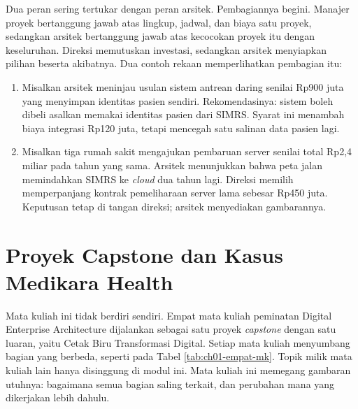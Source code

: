 Dua peran sering tertukar dengan peran arsitek. Pembagiannya begini. Manajer
proyek bertanggung jawab atas lingkup, jadwal, dan biaya satu proyek,
sedangkan arsitek bertanggung jawab atas kecocokan proyek itu dengan
keseluruhan. Direksi memutuskan investasi, sedangkan arsitek menyiapkan
pilihan beserta akibatnya. Dua contoh rekaan memperlihatkan pembagian itu:

\begin{enumerate}
  \item Misalkan arsitek meninjau usulan sistem antrean daring senilai Rp900
        juta yang menyimpan identitas pasien sendiri. Rekomendasinya: sistem
        boleh dibeli asalkan memakai identitas pasien dari SIMRS. Syarat ini
        menambah biaya integrasi Rp120 juta, tetapi mencegah satu salinan data
        pasien lagi.
  \item Misalkan tiga rumah sakit mengajukan pembaruan server senilai total
        Rp2,4 miliar pada tahun yang sama. Arsitek menunjukkan bahwa peta jalan
        memindahkan SIMRS ke \textit{cloud} dua tahun lagi. Direksi memilih
        memperpanjang kontrak pemeliharaan server lama sebesar Rp450 juta.
        Keputusan tetap di tangan direksi; arsitek menyediakan gambarannya.
\end{enumerate}

\section{Proyek Capstone dan Kasus Medikara Health}

Mata kuliah ini tidak berdiri sendiri. Empat mata kuliah peminatan Digital
Enterprise Architecture dijalankan sebagai satu proyek \textit{capstone}
dengan satu luaran, yaitu Cetak Biru Transformasi Digital. Setiap mata kuliah
menyumbang bagian yang berbeda, seperti pada Tabel \ref{tab:ch01-empat-mk}.
Topik milik mata kuliah lain hanya disinggung di modul ini. Mata kuliah ini
memegang gambaran utuhnya: bagaimana semua bagian saling terkait, dan
perubahan mana yang dikerjakan lebih dahulu.

